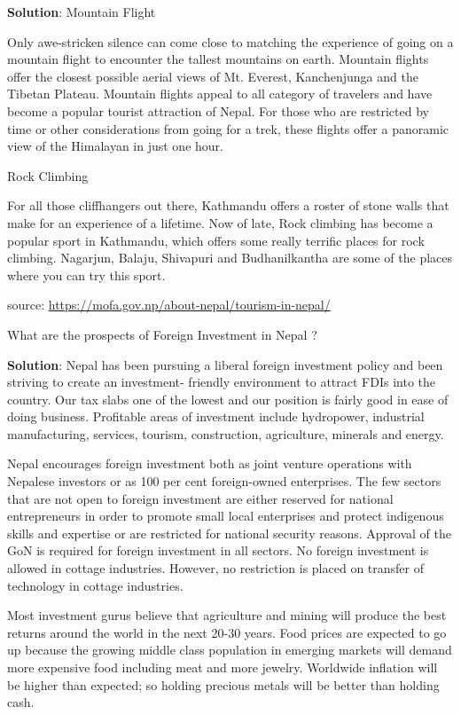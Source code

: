 \documentclass[
  openany]{book}
\newcommand{\question}{\item}
\newenvironment{solution}{ {\bfseries Solution}:}{}
\begin{document}
\begin{questions}
\begin{solution}
Mountain Flight

Only awe-stricken silence can come close to matching the experience of going on a mountain flight to encounter the tallest mountains on earth. Mountain flights offer the closest possible aerial views of Mt. Everest, Kanchenjunga and the Tibetan Plateau. Mountain flights appeal to all category of travelers and have become a popular tourist attraction of Nepal. For those who are restricted by time or other considerations from going for a trek, these flights offer a panoramic view of the Himalayan in just one hour.

Rock Climbing

For all those cliffhangers out there, Kathmandu offers a roster of stone walls that make for an experience of a lifetime. Now of late, Rock climbing has become a popular sport in Kathmandu, which offers some really terrific places for rock climbing. Nagarjun, Balaju, Shivapuri and Budhanilkantha are some of the places where you can try this sport.

source: \url{https://mofa.gov.np/about-nepal/tourism-in-nepal/}
\end{solution}

\question What are the prospects of Foreign Investment in Nepal ?

\begin{solution}
Nepal has been pursuing a liberal foreign investment policy and been striving to create an investment- friendly environment to attract FDIs into the country. Our tax slabs one of the lowest and our position is fairly good in ease of doing business. Profitable areas of investment include hydropower, industrial manufacturing, services, tourism, construction, agriculture, minerals and energy.

Nepal encourages foreign investment both as joint venture operations with Nepalese investors or as 100 per cent foreign-owned enterprises. The few sectors that are not open to foreign investment are either reserved for national entrepreneurs in order to promote small local enterprises and protect indigenous skills and expertise or are restricted for national security reasons. Approval of the GoN is required for foreign investment in all sectors. No foreign investment is allowed in cottage industries. However, no restriction is placed on transfer of technology in cottage industries.

Most investment gurus believe that agriculture and mining will produce the best returns around the world in the next 20-30 years. Food prices are expected to go up because the growing middle class population in emerging markets will demand more expensive food including meat and more jewelry. Worldwide inflation will be higher than expected; so holding precious metals will be better than holding cash.


\end{solution}
\end{questions}
\end{document}
